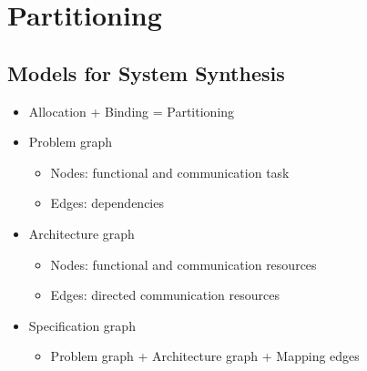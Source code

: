 \section{Partitioning}
\subsection{Models for System Synthesis}
\begin{itemize}
	\item Allocation + Binding = Partitioning
	\item Problem graph
\begin{itemize}
	\item Nodes: functional and communication task
	\item Edges: dependencies
\end{itemize}
	\item Architecture graph
\begin{itemize}
	\item Nodes: functional and communication resources
	\item Edges: directed communication resources 
\end{itemize}
	\item Specification graph
\begin{itemize}
	\item Problem graph + Architecture graph + Mapping edges
\end{itemize}
\end{itemize}

